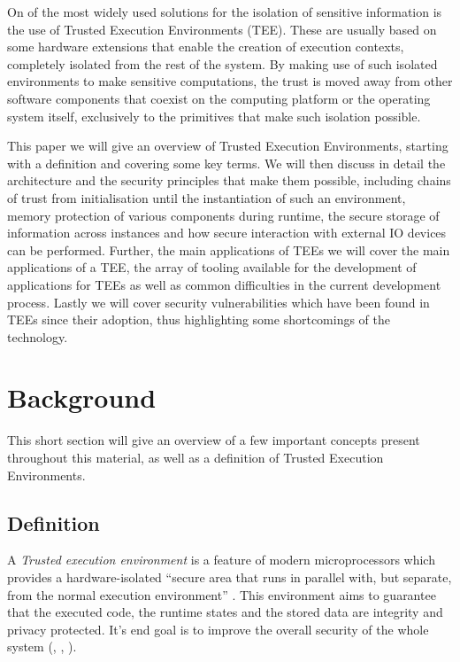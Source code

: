 \documentclass[runningheads,a4paper]{uwsese}
\begin{document}
On of the most widely used solutions for the isolation of sensitive information
is the use of Trusted Execution Environments (TEE). These are usually based on some
hardware extensions that enable the creation of execution contexts, completely
isolated from the rest of the system. By making use of such isolated
environments to make sensitive computations, the trust is moved away from other
software components that coexist on the computing platform or the operating
system itself, exclusively to the primitives that make such isolation possible.

This paper we will give an overview of Trusted Execution Environments, starting
with a definition and covering some key terms. We will then discuss in detail
the architecture and the security principles that make them possible, including
chains of trust from initialisation until the instantiation of such an
environment, memory protection of various components during runtime, the secure
storage of information across instances and how secure interaction with
external IO devices can be performed. Further, the main applications of TEEs we 
will cover the main applications of a TEE, the array of tooling available for
the development of applications for TEEs as well as common difficulties in the 
current development process. Lastly we will cover security vulnerabilities which
have been found in TEEs since their adoption, thus highlighting some shortcomings
of the technology.

\section{Background}

This short section will give an overview of a few important concepts present
throughout this material, as well as a definition of Trusted Execution
Environments.

\subsection{Definition}

A \emph{Trusted execution environment} is a feature of modern microprocessors
which provides a hardware-isolated ``secure area that runs in parallel with,
but separate, from the normal execution environment'' \cite{tee_ieee_standard}.
This environment aims to guarantee that the executed code, the runtime states
and the stored data are integrity and privacy protected. It's end goal is to
improve the overall security of the whole system (\cite{tee_app_rev},
\cite{tee_in_securities}, \cite{tee_is_and_not}).
\end{document}
